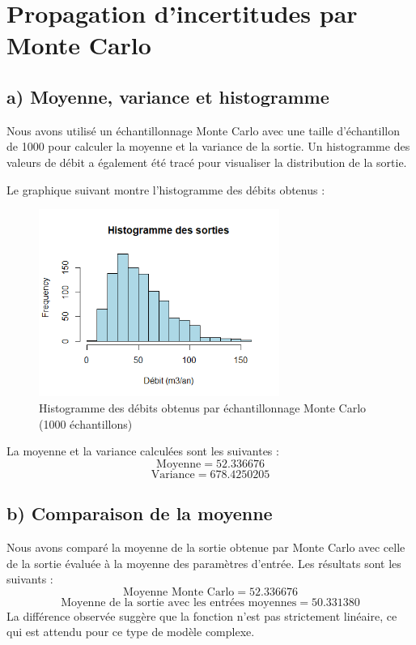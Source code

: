 \documentclass[a4paper,12pt]{article}
\begin{document}
\section{Propagation d’incertitudes par Monte Carlo}

\subsection{a) Moyenne, variance et histogramme}
Nous avons utilisé un échantillonnage Monte Carlo avec une taille d'échantillon de 1000 pour calculer la moyenne et la variance de la sortie. Un histogramme des valeurs de débit a également été tracé pour visualiser la distribution de la sortie.

Le graphique suivant montre l'histogramme des débits obtenus :
\begin{figure}[h!]
    \centering
    \includegraphics[width=0.7\textwidth]{histogramme.png}
    \caption{Histogramme des débits obtenus par échantillonnage Monte Carlo (1000 échantillons)}
\end{figure}

La moyenne et la variance calculées sont les suivantes :
\begin{equation}
\text{Moyenne} = 52.336676
\end{equation}
\begin{equation}
\text{Variance} = 678.4250205
\end{equation}

\subsection{b) Comparaison de la moyenne}
Nous avons comparé la moyenne de la sortie obtenue par Monte Carlo avec celle de la sortie évaluée à la moyenne des paramètres d'entrée. Les résultats sont les suivants :
\begin{equation}
\text{Moyenne Monte Carlo} = 52.336676
\end{equation}
\begin{equation}
\text{Moyenne de la sortie avec les entrées moyennes} = 50.331380
\end{equation}
La différence observée suggère que la fonction n'est pas strictement linéaire, ce qui est attendu pour ce type de modèle complexe.
\end{document}

